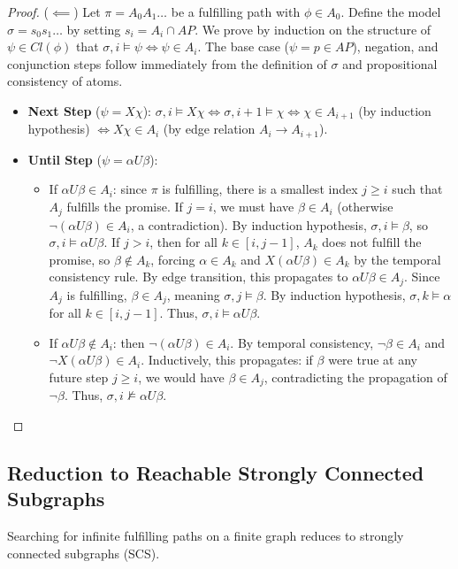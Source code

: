 \begin{proof}
\medskip\noindent
($\impliedby$) Let $\pi = A_0 A_1 \dots$ be a fulfilling path with $\phi \in A_0$. Define the model $\sigma = s_0 s_1 \dots$ by setting $s_i = A_i \cap AP$. We prove by induction on the structure of $\psi \in Cl(\phi)$ that $\sigma, i \models \psi \iff \psi \in A_i$.
The base case ($\psi = p \in AP$), negation, and conjunction steps follow immediately from the definition of $\sigma$ and propositional consistency of atoms.
\begin{itemize}
    \item \textbf{Next Step} ($\psi = X \chi$):
          $\sigma, i \models X \chi \iff \sigma, i+1 \models \chi \iff \chi \in A_{i+1}$ (by induction hypothesis) $\iff X\chi \in A_i$ (by edge relation $A_i \to A_{i+1}$).
    \item \textbf{Until Step} ($\psi = \alpha U \beta$):
          \begin{itemize}
              \item If $\alpha U \beta \in A_i$: since $\pi$ is fulfilling, there is a smallest index $j \ge i$ such that $A_j$ fulfills the promise. If $j=i$, we must have $\beta \in A_i$ (otherwise $\neg(\alpha U \beta) \in A_i$, a contradiction). By induction hypothesis, $\sigma, i \models \beta$, so $\sigma, i \models \alpha U \beta$.
                    If $j > i$, then for all $k \in [i, j-1]$, $A_k$ does not fulfill the promise, so $\beta \notin A_k$, forcing $\alpha \in A_k$ and $X(\alpha U \beta) \in A_k$ by the temporal consistency rule. By edge transition, this propagates to $\alpha U \beta \in A_j$. Since $A_j$ is fulfilling, $\beta \in A_j$, meaning $\sigma, j \models \beta$. By induction hypothesis, $\sigma, k \models \alpha$ for all $k \in [i, j-1]$. Thus, $\sigma, i \models \alpha U \beta$.
              \item If $\alpha U \beta \notin A_i$: then $\neg(\alpha U \beta) \in A_i$. By temporal consistency, $\neg \beta \in A_i$ and $\neg X(\alpha U \beta) \in A_i$. Inductively, this propagates: if $\beta$ were true at any future step $j \ge i$, we would have $\beta \in A_j$, contradicting the propagation of $\neg \beta$. Thus, $\sigma, i \not\models \alpha U \beta$. \qedhere
          \end{itemize}
\end{itemize}
\end{proof}

\subsection{Reduction to Reachable Strongly Connected Subgraphs}
Searching for infinite fulfilling paths on a finite graph reduces to strongly connected subgraphs (SCS).

